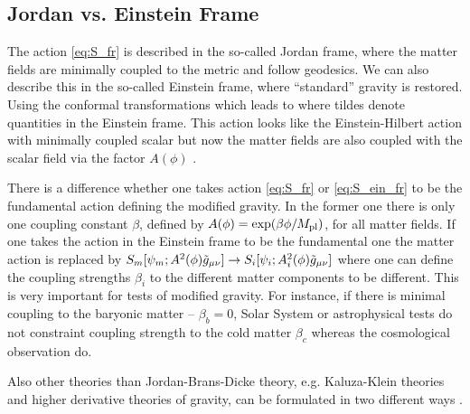 \subsection{Jordan vs. Einstein Frame}
The action \eqref{eq:S_fr} is described in the so-called Jordan frame, where the matter fields are minimally coupled to the metric and follow geodesics. We can also describe this in the so-called Einstein frame, where ``standard'' gravity is restored. Using the conformal transformations%
which leads to
where tildes denote quantities in the Einstein frame. This action looks like the Einstein-Hilbert action with minimally coupled scalar but now the matter fields are also coupled with the scalar field via the factor $A(\phi)$ . %

There is a difference whether one takes action \eqref{eq:S_fr} or \eqref{eq:S_ein_fr} to be the fundamental action defining the modified gravity. In the former one there is only one coupling constant $\beta$, defined by $A(\phi)=\exp(\beta\phi/M_{\text{\scriptsize pl}})$, for all matter fields. If one takes the action in the Einstein frame to be the fundamental one the matter action is replaced by $S_m[\psi_m;A^2(\phi)\tilde{g}_{\mu\nu}]\rightarrow S_i[\psi_i;A_i^2(\phi)\tilde{g}_{\mu\nu}]$ where one can define the coupling strengths $\beta_i$ to the different matter components to be different. This is very important for tests of modified gravity. For instance, if there is minimal coupling to the baryonic matter -- $\beta_b=0$, Solar System or astrophysical tests do not constraint coupling strength to the cold matter $\beta_c$ whereas the cosmological observation do.

Also other theories than Jordan-Brans-Dicke theory, e.g. Kaluza-Klein theories and higher derivative theories of gravity, can be formulated in two different ways \parencite{Faraoni:1998qx}.

